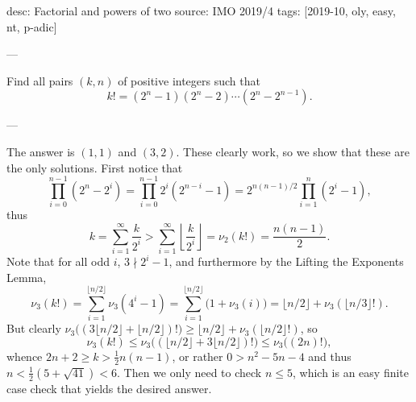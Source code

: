 desc: Factorial and powers of two
source: IMO 2019/4
tags: [2019-10, oly, easy, nt, p-adic]

---

Find all pairs $(k,n)$ of positive integers such that \[k!=(2^n-1)(2^n-2)\cdots(2^n-2^{n-1}).\]

---

The answer is $(1,1)$ and $(3,2)$. These clearly work, so we show that these are the only solutions. First notice that \[\prod_{i=0}^{n-1}\left(2^n-2^i\right)=\prod_{i=0}^{n-1}2^i\left(2^{n-i}-1\right)=2^{n(n-1)/2}\prod_{i=1}^n\left(2^i-1\right),\]
thus \[k=\sum_{i=1}^\infty\frac k{2^i}>\sum_{i=1}^\infty\left\lfloor\frac k{2^i}\right\rfloor=\nu_2(k!)=\frac{n(n-1)}2.\]
Note that for all odd $i$, $3\nmid2^i-1$, and furthermore by the Lifting the Exponents Lemma, \[\nu_3(k!)=\sum_{i=1}^{\lfloor n/2\rfloor}\nu_3\left(4^i-1\right)=\sum_{i=1}^{\lfloor n/2\rfloor}\Big(1+\nu_3(i)\Big)=\lfloor n/2\rfloor+\nu_3\left(\lfloor n/3\rfloor!\right).\]
But clearly $\nu_3\big((3\lfloor n/2\rfloor+\lfloor n/2\rfloor)!\big)\ge\lfloor n/2\rfloor+\nu_3(\lfloor n/2\rfloor!)$, so \[\nu_3(k!)\le\nu_3\big((\lfloor n/2\rfloor+3\lfloor n/2\rfloor)!\big)\le\nu_3\big((2n)!\big),\]
whence $2n+2\ge k>\tfrac12n(n-1)$, or rather $0>n^2-5n-4$ and thus $n<\tfrac12(5+\sqrt{41})<6$. Then we only need to check $n\le5$, which is an easy finite case check that yields the desired answer.
